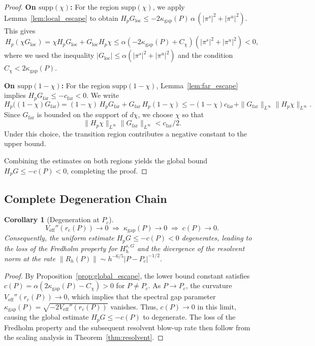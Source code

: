 \documentclass[12pt,a4paper]{amsart}
\newtheorem{corollary}[theorem]{Corollary}
\theoremstyle{remark}
\begin{document}
\begin{proof}
\textbf{On $\mathrm{supp}(\chi)$:}
For the region $\mathrm{supp}(\chi)$, we apply Lemma~\ref{lem:local_escape}
to obtain $H_p G_{\mathrm{loc}} \leq -2\kappa_{\mathrm{gap}}(P)\,\alpha\,(|\pi^s|^2+|\pi^u|^2)$.
This gives
\[
H_p(\chi G_{\mathrm{loc}})
= \chi H_p G_{\mathrm{loc}} + G_{\mathrm{loc}} H_p\chi
\leq \alpha(-2\kappa_{\mathrm{gap}}(P) + C_\chi)(|\pi^s|^2 + |\pi^u|^2) < 0,
\]
where we used the inequality $|G_{\mathrm{loc}}| \leq \alpha(|\pi^s|^2 + |\pi^u|^2)$
and the condition $C_\chi < 2\kappa_{\mathrm{gap}}(P)$.

\textbf{On $\mathrm{supp}(1-\chi)$:}
For the region $\mathrm{supp}(1-\chi)$, Lemma~\ref{lem:far_escape} implies
$H_p G_{\mathrm{far}} \leq -c_{\mathrm{far}} < 0$. We write
\[
H_p\bigl((1-\chi)G_{\mathrm{far}}\bigr)
= (1-\chi)\,H_pG_{\mathrm{far}} + G_{\mathrm{far}}\,H_p(1-\chi)
\leq -(1-\chi)c_{\mathrm{far}} + \|G_{\mathrm{far}}\|_{L^\infty}\|H_p\chi\|_{L^\infty}.
\]
Since $G_{\mathrm{far}}$ is bounded on the support of $d\chi$, we choose
$\chi$ so that
\[
  \|H_p\chi\|_{L^\infty}\|G_{\mathrm{far}}\|_{L^\infty} < c_{\mathrm{far}}/2.
\]
Under this choice, the transition region contributes a negative constant
to the upper bound.

Combining the estimates on both regions yields the global bound $H_p G \leq -c(P) < 0$,
completing the proof.
\end{proof}

\subsection{Complete Degeneration Chain}

\begin{corollary}[Degeneration at $P_c$]
\label{cor:degeneration}
\[
V_{\mathrm{eff}}''(r_c(P)) \to 0
\;\Longrightarrow\;
\kappa_{\mathrm{gap}}(P) \to 0
\;\Longrightarrow\;
c(P) \to 0.
\]
Consequently, the uniform estimate $H_p G \leq -c(P) < 0$ degenerates,
leading to the loss of the Fredholm property for $H_h^{s,G}$ and the
divergence of the resolvent norm at the rate
$\|R_h(P)\| \sim h^{-6/5}|P-P_c|^{-1/2}$.
\end{corollary}

\begin{proof}
By Proposition~\ref{prop:global_escape}, the lower bound constant satisfies
$c(P) = \alpha(2\kappa_{\mathrm{gap}}(P) - C_\chi) > 0$ for $P \neq P_c$. As $P \to P_c$,
the curvature $V_{\mathrm{eff}}''(r_c(P)) \to 0$, which implies that the
spectral gap parameter $\kappa_{\mathrm{gap}}(P) = \sqrt{-2V_{\mathrm{eff}}''(r_c(P))}$ vanishes.
Thus, $c(P) \to 0$ in this limit, causing the global estimate $H_p G \leq -c(P)$
to degenerate. The loss of the Fredholm property and the subsequent resolvent blow-up rate
then follow from the scaling analysis in Theorem~\ref{thm:resolvent}.
\end{proof}
\end{document}
